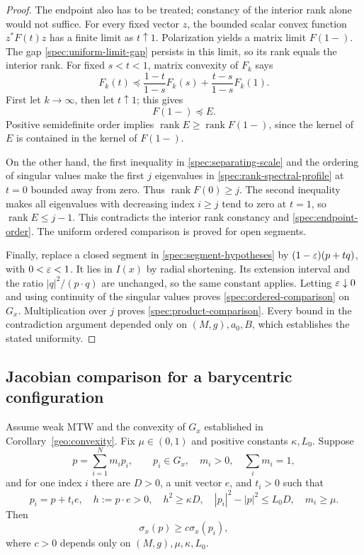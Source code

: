 \begin{proof}
The endpoint also has to be treated; constancy of the interior
rank alone would not suffice.  For every fixed vector $z$, the
bounded scalar convex function $z^*F(t)z$ has a finite limit as
$t\uparrow1$.  Polarization yields a matrix limit $F(1-)$.
The gap \eqref{spec:uniform-limit-gap} persists in this limit,
so its rank equals the interior rank.  For fixed $s<t<1$,
matrix convexity of $F_k$ says
\[
  F_k(t)\preceq\frac{1-t}{1-s}F_k(s)
                         +\frac{t-s}{1-s}F_k(1).
\]
First let $k\to\infty$, then let $t\uparrow1$; this gives
\begin{equation}\label{spec:endpoint-order}
  F(1-)\preceq E.
\end{equation}
Positive semidefinite order implies
$\operatorname{rank}E\ge\operatorname{rank}F(1-)$, since the
kernel of $E$ is contained in the kernel of $F(1-)$.

On the other hand, the first inequality in
\eqref{spec:separating-scale} and the ordering of singular values
make the first $j$ eigenvalues in
\eqref{spec:rank-spectral-profile} at $t=0$ bounded away from
zero.  Thus $\operatorname{rank}F(0)\ge j$.  The second inequality
makes all eigenvalues with decreasing index $i\ge j$ tend to
zero at $t=1$, so $\operatorname{rank}E\le j-1$.  This contradicts
the interior rank constancy and \eqref{spec:endpoint-order}.
The uniform ordered comparison is proved for open segments.

Finally, replace a closed segment in \eqref{spec:segment-hypotheses}
by $(1-\varepsilon)(p+tq)$, with $0<\varepsilon<1$.  It lies in $I(x)$ by
radial shortening.  Its extension interval and the ratio
$|q|^2/(p\cdot q)$ are unchanged, so the same constant applies.
Letting $\varepsilon\downarrow0$ and using continuity of the singular
values proves \eqref{spec:ordered-comparison} on $G_x$.
Multiplication over $j$ proves
\eqref{spec:product-comparison}.  Every bound in the contradiction
argument depended only on $(M,g),a_0,B$, which establishes the
stated uniformity.
\end{proof}

\subsection{Jacobian comparison for a barycentric configuration}

\begin{corollary}\label{spec:outward}
Assume weak MTW and the convexity of $G_x$ established in
Corollary~\ref{geo:convexity}.  Fix $\mu\in(0,1)$ and positive constants
$\kappa,L_0$.  Suppose
\[
  p=\sum_{i=1}^N m_i p_i,\qquad
  p_i\in G_x,\quad m_i>0,\quad\sum_i m_i=1,
\]
and for one index $i$ there are $D>0$, a unit vector $e$, and
$t_i>0$ such that
\begin{equation}\label{spec:outward-data}
  p_i=p+t_i e,\quad h:=p\cdot e>0,\quad
  h^2\ge\kappa D,\quad
  |p_i|^2-|p|^2\le L_0D,\quad m_i\ge\mu.
\end{equation}
Then
\begin{equation}\label{spec:outward-det}
  \sigma_x(p)\ge c\sigma_x(p_i),
\end{equation}
where $c>0$ depends only on $(M,g),\mu,\kappa,L_0$.
\end{corollary}

